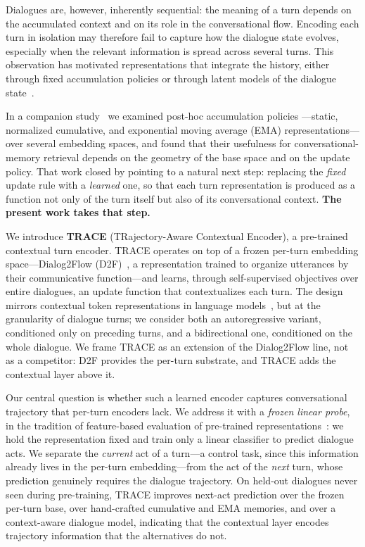 \documentclass[11pt]{article}
\begin{document}
Dialogues are, however, inherently sequential: the meaning of a turn depends on the accumulated
context and on its role in the conversational flow. Encoding each turn in isolation may therefore
fail to capture how the dialogue state evolves, especially when the relevant information is spread
across several turns. This observation has motivated representations that integrate the history,
either through fixed accumulation policies or through latent models of the dialogue
state~\cite{wen2018sequence,min2020dialogue,hudecek2022latent,liu2023vls}.

In a companion study~\cite{fernandez2025retrieving} we examined post-hoc accumulation policies
---static, normalized cumulative, and exponential moving average (EMA) representations--- over
several embedding spaces, and found that their usefulness for conversational-memory retrieval
depends on the geometry of the base space and on the update policy. That work closed by pointing to
a natural next step: replacing the \emph{fixed} update rule with a \emph{learned} one, so that each
turn representation is produced as a function not only of the turn itself but also of its
conversational context. \textbf{The present work takes that step.}

We introduce \textbf{TRACE} (TRajectory-Aware Contextual Encoder), a pre-trained contextual turn
encoder. TRACE operates on top of a frozen per-turn embedding space---Dialog2Flow
(D2F)~\cite{burdisso2024dialog2flow}, a representation trained to organize utterances by their
communicative function---and learns, through self-supervised objectives over entire dialogues, an
update function that contextualizes each turn. The design mirrors contextual token representations
in language models~\cite{devlin2019bert}, but at the granularity of dialogue turns; we consider both
an autoregressive variant, conditioned only on preceding turns, and a bidirectional one, conditioned
on the whole dialogue. We frame TRACE as an extension of the Dialog2Flow line, not as a competitor:
D2F provides the per-turn substrate, and TRACE adds the contextual layer above it.

Our central question is whether such a learned encoder captures conversational trajectory that
per-turn encoders lack. We address it with a \emph{frozen linear probe}, in the tradition of
feature-based evaluation of pre-trained representations~\cite{devlin2019bert}: we hold the
representation fixed and train only a linear classifier to predict dialogue acts. We separate the
\emph{current} act of a turn---a control task, since this information already lives in the per-turn
embedding---from the act of the \emph{next} turn, whose prediction genuinely requires the dialogue
trajectory. On held-out dialogues never seen during pre-training, TRACE improves next-act prediction
over the frozen per-turn base, over hand-crafted cumulative and EMA memories, and over a
context-aware dialogue model, indicating that the contextual layer encodes trajectory information
that the alternatives do not.
\end{document}
